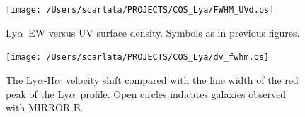 \documentclass[manuscript]{emulateapj}
\newcommand{\lya}{Ly$\alpha$}
\newcommand{\ha}{H$\alpha$}
\begin{document}
\begin{figure}[t!]
   \centering
   \texttt{[image: /Users/scarlata/PROJECTS/COS\_Lya/FWHM\_UVd.ps]}
   \caption{\lya\ EW versus UV surface density. Symbols as in
     previous figures.}
   \label{fig:lyauvsd}
\end{figure}

\begin{figure}[t!]
   \centering
   \texttt{[image: /Users/scarlata/PROJECTS/COS\_Lya/dv\_fwhm.ps]}
   \caption{The \lya-\ha\ velocity shift compared with the line width
     of the red peak of the \lya\ profile. Open circles indicates
     galaxies observed with MIRROR-B.}
   \label{fig:dvha}
\end{figure}





\end{document}
